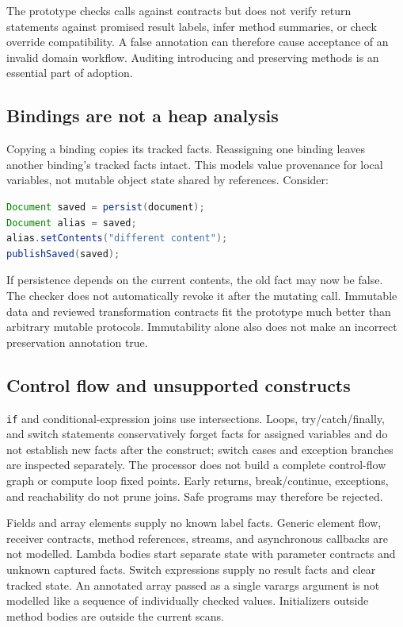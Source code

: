 \documentclass[11pt]{article}
\begin{document}
The prototype checks calls against contracts but does not verify return
statements against promised result labels, infer method summaries, or check
override compatibility. A false annotation can therefore cause acceptance of
an invalid domain workflow. Auditing introducing and preserving methods is an
essential part of adoption.

\subsection{Bindings are not a heap analysis}

Copying a binding copies its tracked facts. Reassigning one binding leaves
another binding's tracked facts intact. This models value provenance for local
variables, not mutable object state shared by references. Consider:
\begin{lstlisting}[language=Java]
Document saved = persist(document);
Document alias = saved;
alias.setContents("different content");
publishSaved(saved);
\end{lstlisting}
If persistence depends on the current contents, the old fact may now be false.
The checker does not automatically revoke it after the mutating call. Immutable
data and reviewed transformation contracts fit the prototype much better than
arbitrary mutable protocols. Immutability alone also does not make an incorrect
preservation annotation true.

\subsection{Control flow and unsupported constructs}

\texttt{if} and conditional-expression joins use intersections. Loops,
try/catch/finally, and switch statements conservatively forget facts for assigned
variables and do not establish new facts after the construct; switch cases and
exception branches are inspected separately. The processor does not build a
complete control-flow graph or compute loop fixed points. Early returns,
break/continue, exceptions, and reachability do not prune joins. Safe programs
may therefore be rejected.

Fields and array elements supply no known label facts. Generic element flow,
receiver contracts, method references, streams, and asynchronous callbacks are
not modelled. Lambda bodies start separate state with parameter contracts and
unknown captured facts. Switch expressions supply no result facts and clear
tracked state. An annotated array passed as a single varargs argument is not
modelled like a sequence of individually checked values. Initializers outside
method bodies are outside the current scans.
\end{document}

